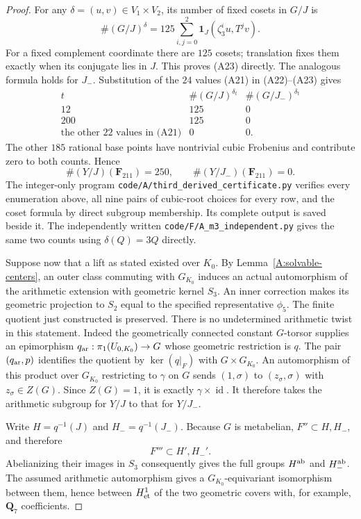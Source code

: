 \documentclass[11pt,oneside]{article}
\begin{document}
\begin{proof}
For any $\delta=(u,v)\in V_1\times V_2$, its number of
fixed cosets in $G/J$ is
\[
 \#(G/J)^\delta
   =125\sum_{i,j=0}^2
       \mathbf1_J(\zeta_3^iu,T^jv).                            \tag{A23}
\]
For a fixed complement coordinate there are $125$ cosets;
translation fixes them exactly when its conjugate lies
in $J$. This proves (A23) directly. The analogous formula
holds for $J_-$. Substitution of the $24$ values (A21)
in (A22)--(A23) gives
\[
\begin{array}{c|rr}
 t&\#(G/J)^{\delta_t}&\#(G/J_-)^{\delta_t}\\ \hline
 12&125&0\\
 200&125&0\\
 \text{the other 22 values in (A21)}&0&0.
\end{array}
\]
The other $185$ rational base points have nontrivial cubic
Frobenius and contribute zero to both counts. Hence
\[
       \#(Y/J)(\mathbf F_{211})=250,
       \qquad \#(Y/J_-)(\mathbf F_{211})=0.                     \tag{A24}
\]
The integer-only program
\texttt{code/A/third\_derived\_certificate.py} verifies
every enumeration above, all nine pairs of cubic-root
choices for every row, and the coset formula by direct
subgroup membership. Its complete output is saved beside
it. The independently written
\texttt{code/F/A\_m3\_independent.py} gives the same two
counts using $\delta(Q)=3Q$ directly.

Suppose now that a lift as stated existed over $K_0$.
By Lemma~\ref{A:solvable-centers}, an outer class commuting
with $G_{K_0}$ induces an actual automorphism of the
arithmetic extension with geometric kernel $S_3$.
An inner correction makes its geometric projection to
$S_2$ equal to the specified representative $\phi_5$.
The finite quotient just constructed is preserved.
There is no undetermined arithmetic twist in this
statement. Indeed the geometrically connected constant
$G$-torsor supplies an epimorphism
$q_{\rm ar}:\pi_1(U_{0,K_0})\to G$ whose geometric
restriction is $q$. The pair $(q_{\rm ar},p)$ identifies
the quotient by $\ker(q|_F)$ with $G\times G_{K_0}$.
An automorphism of this product over $G_{K_0}$ restricting
to $\gamma$ on $G$ sends $(1,\sigma)$ to
$(z_\sigma,\sigma)$ with $z_\sigma\in Z(G)$. Since
$Z(G)=1$, it is exactly $\gamma\times\operatorname{id}$.
It therefore takes the arithmetic subgroup for $Y/J$
to that for $Y/J_-$.

Write $H=q^{-1}(J)$ and $H_-=q^{-1}(J_-)$. Because $G$
is metabelian, $F''\subset H,H_-$, and therefore
\[
                       F'''\subset H',H_-'.
\]
Abelianizing their images in $S_3$ consequently gives
the full groups $H^{\rm ab}$ and $H_-^{\rm ab}$.
The assumed arithmetic automorphism gives a
$G_{K_0}$-equivariant isomorphism between them, hence
between $H^1_{\rm et}$ of the two geometric covers with,
for example, $\mathbf Q_7$ coefficients.


\end{proof}
\end{document}
